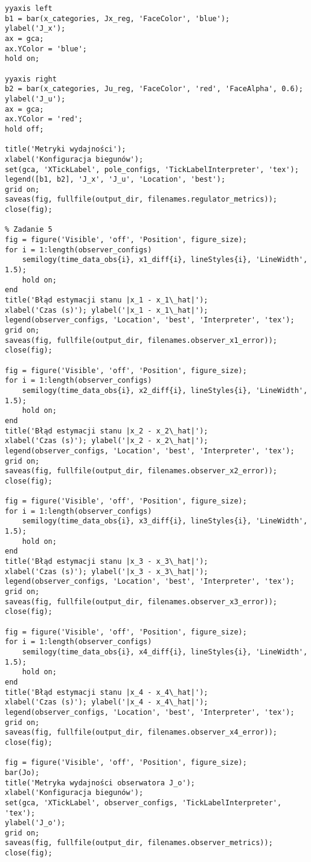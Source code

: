 \documentclass[a4paper,titlepage,11pt,floatssmall]{mwrep} %
\begin{document}
\begin{lstlisting}[style=custommatlab, caption={Pełny kod skryptu \texttt{combined\_plots.m}.}, label={lst:init_full}]
yyaxis left
b1 = bar(x_categories, Jx_reg, 'FaceColor', 'blue');
ylabel('J_x');
ax = gca;
ax.YColor = 'blue';
hold on;

yyaxis right
b2 = bar(x_categories, Ju_reg, 'FaceColor', 'red', 'FaceAlpha', 0.6);
ylabel('J_u');
ax = gca;
ax.YColor = 'red';
hold off;

title('Metryki wydajności');
xlabel('Konfiguracja biegunów');
set(gca, 'XTickLabel', pole_configs, 'TickLabelInterpreter', 'tex');
legend([b1, b2], 'J_x', 'J_u', 'Location', 'best');
grid on;
saveas(fig, fullfile(output_dir, filenames.regulator_metrics));
close(fig);

% Zadanie 5
fig = figure('Visible', 'off', 'Position', figure_size);
for i = 1:length(observer_configs)
    semilogy(time_data_obs{i}, x1_diff{i}, lineStyles{i}, 'LineWidth', 1.5);
    hold on;
end
title('Błąd estymacji stanu |x_1 - x_1\_hat|');
xlabel('Czas (s)'); ylabel('|x_1 - x_1\_hat|');
legend(observer_configs, 'Location', 'best', 'Interpreter', 'tex');
grid on;
saveas(fig, fullfile(output_dir, filenames.observer_x1_error));
close(fig);

fig = figure('Visible', 'off', 'Position', figure_size);
for i = 1:length(observer_configs)
    semilogy(time_data_obs{i}, x2_diff{i}, lineStyles{i}, 'LineWidth', 1.5);
    hold on;
end
title('Błąd estymacji stanu |x_2 - x_2\_hat|');
xlabel('Czas (s)'); ylabel('|x_2 - x_2\_hat|');
legend(observer_configs, 'Location', 'best', 'Interpreter', 'tex');
grid on;
saveas(fig, fullfile(output_dir, filenames.observer_x2_error));
close(fig);

fig = figure('Visible', 'off', 'Position', figure_size);
for i = 1:length(observer_configs)
    semilogy(time_data_obs{i}, x3_diff{i}, lineStyles{i}, 'LineWidth', 1.5);
    hold on;
end
title('Błąd estymacji stanu |x_3 - x_3\_hat|');
xlabel('Czas (s)'); ylabel('|x_3 - x_3\_hat|');
legend(observer_configs, 'Location', 'best', 'Interpreter', 'tex');
grid on;
saveas(fig, fullfile(output_dir, filenames.observer_x3_error));
close(fig);

fig = figure('Visible', 'off', 'Position', figure_size);
for i = 1:length(observer_configs)
    semilogy(time_data_obs{i}, x4_diff{i}, lineStyles{i}, 'LineWidth', 1.5);
    hold on;
end
title('Błąd estymacji stanu |x_4 - x_4\_hat|');
xlabel('Czas (s)'); ylabel('|x_4 - x_4\_hat|');
legend(observer_configs, 'Location', 'best', 'Interpreter', 'tex');
grid on;
saveas(fig, fullfile(output_dir, filenames.observer_x4_error));
close(fig);

fig = figure('Visible', 'off', 'Position', figure_size);
bar(Jo);
title('Metryka wydajności obserwatora J_o');
xlabel('Konfiguracja biegunów');
set(gca, 'XTickLabel', observer_configs, 'TickLabelInterpreter', 'tex');
ylabel('J_o');
grid on;
saveas(fig, fullfile(output_dir, filenames.observer_metrics));
close(fig);


\end{lstlisting}
\end{document}
